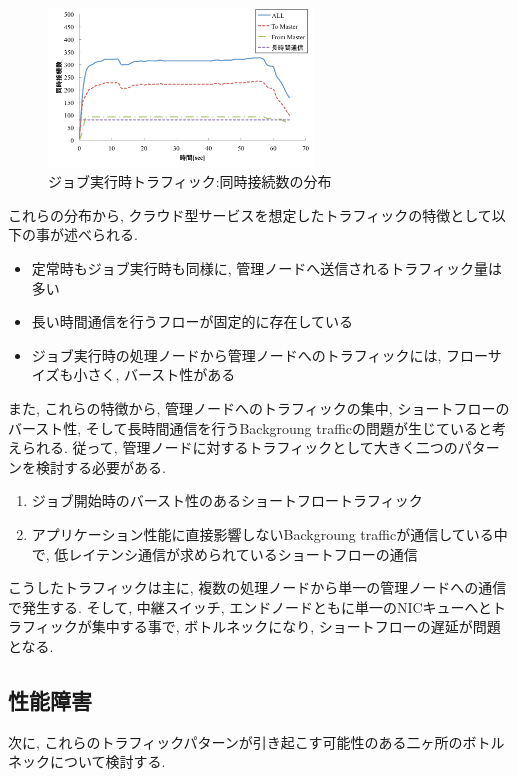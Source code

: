 \begin{figure}[t]
    \begin{center}
    \includegraphics[autoebb, width=200pt]{./img/job_conc.pdf}
    \caption{ジョブ実行時トラフィック:同時接続数の分布}
    \label{fig:job_conc}
    \end{center}
\end{figure}

これらの分布から, クラウド型サービスを想定したトラフィックの特徴として以下の事が述べられる.
\begin{itemize}
  \item 定常時もジョブ実行時も同様に, 管理ノードへ送信されるトラフィック量は多い
  \item 長い時間通信を行うフローが固定的に存在している
  \item ジョブ実行時の処理ノードから管理ノードへのトラフィックには, フローサイズも小さく, バースト性がある
\end{itemize}

また, これらの特徴から, 管理ノードへのトラフィックの集中, ショートフローのバースト性,
そして長時間通信を行うBackgroung trafficの問題が生じていると考えられる.
従って, 管理ノードに対するトラフィックとして大きく二つのパターンを検討する必要がある.
\begin{enumerate}
  \item ジョブ開始時のバースト性のあるショートフロートラフィック
  \item アプリケーション性能に直接影響しないBackgroung trafficが通信している中で,
  低レイテンシ通信が求められているショートフローの通信
\end{enumerate}

こうしたトラフィックは主に, 複数の処理ノードから単一の管理ノードへの通信で発生する.
そして, 中継スイッチ, エンドノードともに単一のNICキューへとトラフィックが集中する事で, ボトルネックになり,
ショートフローの遅延が問題となる\cite{bottleneck}.

\subsection{性能障害}
\label{sec:expected_effect}
次に, これらのトラフィックパターンが引き起こす可能性のある二ヶ所のボトルネックについて検討する.

